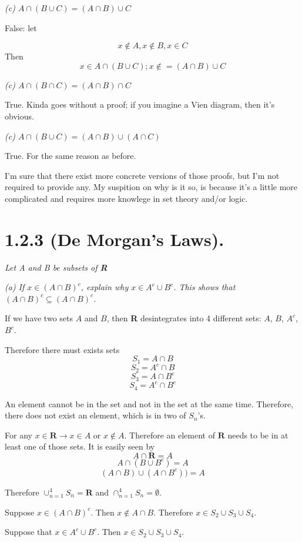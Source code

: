 \documentclass[11pt,oneside,titlepage]{book}
\begin{document}
\textit{(c) $A \cap (B \cup C) = (A \cap B) \cup C$}

False: let

$$x \notin A, x \notin B, x \in C$$
Then
$$x \in A \cap (B \cup C); x \notin = (A \cap B) \cup C$$

\textit{(c) $A \cap (B \cap C) = (A \cap B) \cap C$}

True. Kinda goes without a proof; if you imagine a Vien diagram, then it's
obvious.

\textit{(c) $A \cap (B \cup C) = (A \cap B)  \cup (A \cap C)$}

True. For the same reason as before.

I'm sure that there exist more concrete versions of those proofs, but I'm not
required to provide any. My suspition on why is it so, is because it's a
little more complicated and requires more knowlege in set theory and/or logic.

\section*{1.2.3 (De Morgan's Laws).}

\textit{Let A and B be subsets of \textbf{R}}

\textit{(a) If $x \in (A \cap B)^c$, explain why $x \in A^c \cup B^c$. This
  shows that $(A \cap B)^c \subseteq (A \cap B)^c$.}

If we have two sets $A$ and $B$, then \textbf{R} desintegrates into 4 different
sets: $A$, $B$, $A^c$, $B^c$.

Therefore there must exists sets
$$S_1 = A \cap B$$
$$S_2 = A^c \cap B$$
$$S_3 = A \cap B^c$$
$$S_4 = A^c \cap B^c$$

An element cannot be in the set and not in the set at the same time. Therefore,
there does not exist an element, which is in two of $S_n$'s.

For any $x \in \textbf{R} \to x \in A$ or $x \notin A$. Therefore an element
of $\textbf{R}$ needs to be in at least one of those sets. It is easily seen by
$$A \cap \textbf{R} = A$$
$$A \cap (B \cup B^c) = A$$
$$(A \cap B) \cup (A \cap B^c)) = A$$

Therefore $\cup_{n = 1}^4 S_n = \textbf{R}$ and
$\cap_{n = 1}^4 S_n = \emptyset$.

Suppose $x \in (A \cap B)^c$. Then $x \notin A \cap B$. Therefore
$x \in S_2 \cup S_3 \cup S_4$.

Suppose that $x \in A^c \cup B^c$. Then $x \in S_2 \cup S_3 \cup S_4$.
\end{document}
